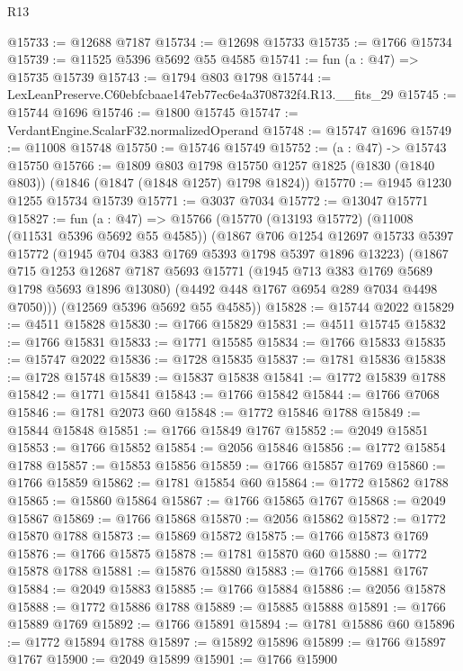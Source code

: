 \begin{lexlean}{R13}
\begin{coremodule}
@15733 := @12688 @7187
@15734 := @12698 @15733
@15735 := @1766 @15734
@15739 := @11525 @5396 @5692 @55 @4585
@15741 := fun (a : @47) => @15735 @15739
@15743 := @1794 @803 @1798
@15744 := LexLeanPreserve.C60ebfcbaae147eb77ec6e4a3708732f4.R13.__fits_29
@15745 := @15744 @1696
@15746 := @1800 @15745
@15747 := VerdantEngine.ScalarF32.normalizedOperand
@15748 := @15747 @1696
@15749 := @11008 @15748
@15750 := @15746 @15749
@15752 := (a : @47) -> @15743 @15750
@15766 := @1809
    @803
    @1798
    @15750
    @1257
    @1825
    (@1830 (@1840 @803))
    (@1846 (@1847 (@1848 @1257) @1798 @1824))
@15770 := @1945 @1230 @1255 @15734 @15739
@15771 := @3037 @7034
@15772 := @13047 @15771
@15827 := fun (a : @47) =>
  @15766
    (@15770
      (@13193 @15772)
      (@11008 (@11531 @5396 @5692 @55 @4585))
      (@1867
        @706
        @1254
        @12697
        @15733
        @5397
        @15772
        (@1945 @704 @383 @1769 @5393 @1798 @5397 @1896 @13223)
        (@1867
          @715
          @1253
          @12687
          @7187
          @5693
          @15771
          (@1945 @713 @383 @1769 @5689 @1798 @5693 @1896 @13080)
          (@4492 @448 @1767 @6954 @289 @7034 @4498 @7050)))
      (@12569 @5396 @5692 @55 @4585))
@15828 := @15744 @2022
@15829 := @4511 @15828
@15830 := @1766 @15829
@15831 := @4511 @15745
@15832 := @1766 @15831
@15833 := @1771 @15585
@15834 := @1766 @15833
@15835 := @15747 @2022
@15836 := @1728 @15835
@15837 := @1781 @15836
@15838 := @1728 @15748
@15839 := @15837 @15838
@15841 := @1772 @15839 @1788
@15842 := @1771 @15841
@15843 := @1766 @15842
@15844 := @1766 @7068
@15846 := @1781 @2073 @60
@15848 := @1772 @15846 @1788
@15849 := @15844 @15848
@15851 := @1766 @15849 @1767
@15852 := @2049 @15851
@15853 := @1766 @15852
@15854 := @2056 @15846
@15856 := @1772 @15854 @1788
@15857 := @15853 @15856
@15859 := @1766 @15857 @1769
@15860 := @1766 @15859
@15862 := @1781 @15854 @60
@15864 := @1772 @15862 @1788
@15865 := @15860 @15864
@15867 := @1766 @15865 @1767
@15868 := @2049 @15867
@15869 := @1766 @15868
@15870 := @2056 @15862
@15872 := @1772 @15870 @1788
@15873 := @15869 @15872
@15875 := @1766 @15873 @1769
@15876 := @1766 @15875
@15878 := @1781 @15870 @60
@15880 := @1772 @15878 @1788
@15881 := @15876 @15880
@15883 := @1766 @15881 @1767
@15884 := @2049 @15883
@15885 := @1766 @15884
@15886 := @2056 @15878
@15888 := @1772 @15886 @1788
@15889 := @15885 @15888
@15891 := @1766 @15889 @1769
@15892 := @1766 @15891
@15894 := @1781 @15886 @60
@15896 := @1772 @15894 @1788
@15897 := @15892 @15896
@15899 := @1766 @15897 @1767
@15900 := @2049 @15899
@15901 := @1766 @15900

\end{coremodule}
\end{lexlean}
